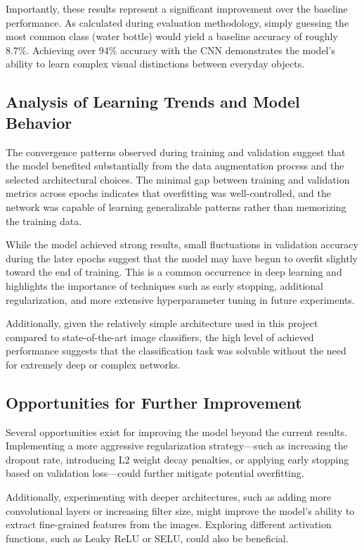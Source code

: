 \documentclass[10pt]{article}
\begin{document}
Importantly, these results represent a significant improvement over the baseline performance. As calculated during evaluation methodology, simply guessing the most common class (water bottle) would yield a baseline accuracy of roughly 8.7\%. Achieving over 94\% accuracy with the CNN demonstrates the model's ability to learn complex visual distinctions between everyday objects.

\subsection{Analysis of Learning Trends and Model Behavior}

The convergence patterns observed during training and validation suggest that the model benefited substantially from the data augmentation process and the selected architectural choices. The minimal gap between training and validation metrics across epochs indicates that overfitting was well-controlled, and the network was capable of learning generalizable patterns rather than memorizing the training data.

While the model achieved strong results, small fluctuations in validation accuracy during the later epochs suggest that the model may have begun to overfit slightly toward the end of training. This is a common occurrence in deep learning and highlights the importance of techniques such as early stopping, additional regularization, and more extensive hyperparameter tuning in future experiments.

Additionally, given the relatively simple architecture used in this project compared to state-of-the-art image classifiers, the high level of achieved performance suggests that the classification task was solvable without the need for extremely deep or complex networks.

\subsection{Opportunities for Further Improvement}

Several opportunities exist for improving the model beyond the current results. Implementing a more aggressive regularization strategy—such as increasing the dropout rate, introducing L2 weight decay penalties, or applying early stopping based on validation loss—could further mitigate potential overfitting.

Additionally, experimenting with deeper architectures, such as adding more convolutional layers or increasing filter size, might improve the model's ability to extract fine-grained features from the images. Exploring different activation functions, such as Leaky ReLU or SELU, could also be beneficial.
\end{document}
